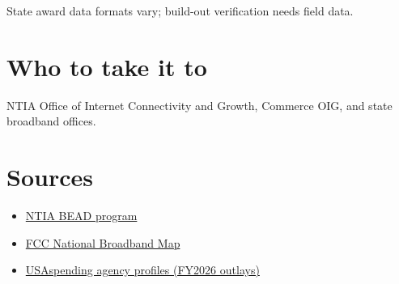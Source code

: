 \documentclass[letterpaper,11pt]{article}
\providecommand{\tightlist}{\setlength{\itemsep}{0pt}\setlength{\parskip}{0pt}}
\begin{document}
State award data formats vary; build-out verification needs field data.

\hypertarget{who-to-take-it-to}{%
\section{Who to take it to}\label{who-to-take-it-to}}

NTIA Office of Internet Connectivity and Growth, Commerce OIG, and state
broadband offices.

\hypertarget{sources}{%
\section{Sources}\label{sources}}

\begin{itemize}
\tightlist
\item
  \href{https://broadbandusa.ntia.gov/funding-programs/broadband-equity-access-and-deployment-bead-program}{NTIA
  BEAD program}
\item
  \href{https://broadbandmap.fcc.gov/}{FCC National Broadband Map}
\item
  \href{https://www.usaspending.gov/agency}{USAspending agency profiles
  (FY2026 outlays)}
\end{itemize}
\end{document}
